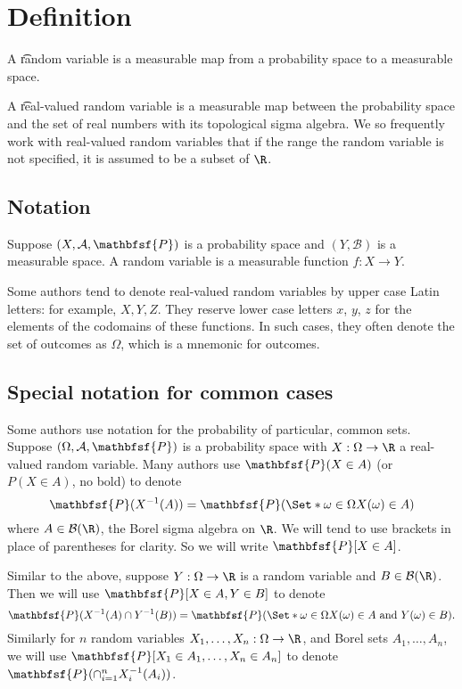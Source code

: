 
\section*{Definition}

A \t{random variable} is a measurable map from a probability space to a measurable space.

A \t{real-valued random variable} is a measurable map between the probability space and the set of real numbers with its topological sigma algebra.
We so frequently work with real-valued random variables that if the range the random variable is not specified, it is assumed to be a subset of $\R $.

\subsection*{Notation}

Suppose $(X, \mathcal{A} , \mathbfsf{P} )$ is a probability space and $(Y, \mathcal{B} )$ is a measurable space.
A random variable is a measurable function $f: X \to Y$.

Some authors tend to denote real-valued random variables by upper case Latin letters: for example, $X, Y, Z$.
They reserve lower case letters $x$, $y$, $z$ for the elements of the codomains of these functions.
In such cases, they often denote the set of outcomes as $\Omega $, which is a mnemonic for outcomes.

\subsection*{Special notation for common cases}

Some authors use notation for the probability of particular, common sets.
Suppose $(\Omega , \mathcal{A} , \mathbfsf{P} )$ is a probability space with $X: \Omega  \to \R $ a real-valued random variable.
Many authors use $\mathbfsf{P} (X \in A)$ (or $P(X \in A)$, no bold) to denote
\[
\mathbfsf{P} (X^{-1}(A)) = \mathbfsf{P} (\Set*{\omega  \in \Omega }{X(\omega ) \in A})
\]
where $A \in \mathcal{B} (\R )$, the Borel sigma algebra on $\R $.
We will tend to use brackets in place of parentheses for clarity.
So we will write $\mathbfsf{P} [ X \in A ]$.

Similar to the above, suppose $Y: \Omega  \to \R $ is a random variable and $B \in \mathcal{B} (\R )$.
Then we will use $\mathbfsf{P} [X \in A, Y \in B]$ to denote
\[
\mathbfsf{P} (X^{-1}(A) \cap  Y^{-1}(B)) = \mathbfsf{P} (\Set*{\omega  \in \Omega }{X(\omega ) \in A \text{ and } Y(\omega ) \in B}).
\]
Similarly for $n$ random variables $X_1, \dots , X_n: \Omega \to \R $, and Borel sets $A_1, \dots , A_n$, we will use $\mathbfsf{P} [X_1 \in A_1, \dots , X_n \in A_n]$ to denote $\mathbfsf{P} (\cap _{i = 1}^{n} X_i^{-1}(A_i))$.

\blankpage
